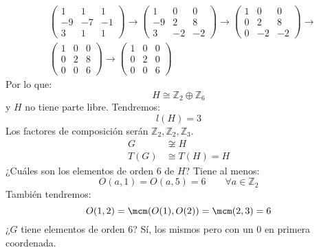 \begin{ejemplo}
    \begin{align*}
        &\left(\begin{array}{ccc}
            1 & 1 & 1 \\
            -9 & -7 &-1 \\
            3 & 1 & 1
        \end{array}\right)
        \stackrel{}{\longrightarrow}
        \left(\begin{array}{ccc}
            1 & 0 & 0 \\
            -9 & 2 & 8 \\
            3 & -2 & -2
        \end{array}\right)
        \stackrel{}{\longrightarrow}
        \left(\begin{array}{ccc}
            1 & 0 & 0 \\
            0 & 2 & 8 \\
            0 & -2 & -2
        \end{array}\right)
        \stackrel{}{\longrightarrow} \\
        &\left(\begin{array}{ccc}
            1 & 0 & 0 \\
            0 & 2 & 8 \\
            0 & 0 & 6
        \end{array}\right)
        \stackrel{}{\longrightarrow} 
        \left(\begin{array}{ccc}
            1 & 0 & 0 \\
            0 & 2 & 0 \\
            0 & 0 & 6
        \end{array}\right)
    \end{align*}
    Por lo que:
    \begin{equation*}
        H\cong \mathbb{Z}_2 \oplus \mathbb{Z}_6
    \end{equation*}
    y $H$ no tiene parte libre. Tendremos:
    \begin{equation*}
        l(H) = 3
    \end{equation*}
    Los factores de composición serán $\mathbb{Z}_2, \mathbb{Z}_2, \mathbb{Z}_3$.
    \begin{align*}
        G&\not\cong H \\
        T(G)&\cong T(H) = H
    \end{align*}
    ¿Cuáles son los elementos de orden 6 de $H$? Tiene al menos:
    \begin{equation*}
        O(a,1) = O(a,5) = 6 \qquad \forall a\in \mathbb{Z}_2
    \end{equation*}
    También tendremos:
    \begin{equation*}
        O(1,2) = \mcm(O(1), O(2)) = \mcm(2, 3) = 6
    \end{equation*}
    ¿$G$ tiene elementos de orden 6? Sí, los mismos pero con un 0 en primera coordenada.
\end{ejemplo}
